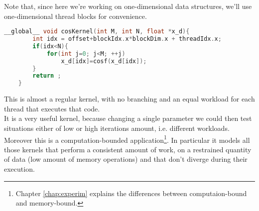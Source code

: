 	Note that, since here we're working on one-dimensional data structures, we'll use one-dimensional thread blocks for convenience.
	\begin{lstlisting}[language=C++, caption={Implementation for Simple-Computation Kernel}]
	__global__ void cosKernel(int M, int N, float *x_d){  		  
		int idx = offset+blockIdx.x*blockDim.x + threadIdx.x; 		
		if(idx<N){		
			for(int j=0; j<M; ++j)
				x_d[idx]=cosf(x_d[idx]);  		
		}
		return ;
	}
	\end{lstlisting}
	This is almost a regular kernel, with no branching and an equal workload for each thread that executes that code.\\
	It is a very useful kernel, because changing a single parameter we could then test situations either of low or high iterations amount, i.e. different workloads.\\
	Moreover this is a computation-bounded application\footnote{Chapter \ref{chap:experim} explains the differences between computaion-bound and memory-bound.}. In particular it models all those kernels that perform a consistent amount of work, on a restrained quantity of data (low amount of memory operations) and that don't diverge during their execution.

	
